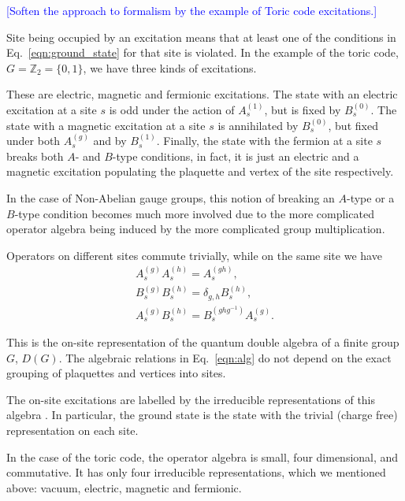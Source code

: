 \documentclass[two column]{article}
\newcommand{\jovan}[1]{\textcolor{blue}{[#1]}}
\begin{document}
\jovan{Soften the approach to formalism by the example of Toric code excitations.}

Site being occupied by an excitation means that at least one of the conditions in Eq.~\eqref{eqn:ground_state} for that site is violated. In the example of the toric code, $G = \mathbb{Z}_2 = \{0, 1\}$, we have three kinds of excitations. 

These are electric, magnetic and fermionic excitations. The state with an electric excitation at a site $s$ is odd under the action of $A_s^{(1)}$, but is fixed by $B_s^{(0)}$. The state with a magnetic excitation at a site $s$ is annihilated by $B_s^{(0)}$, but fixed under both $A_s^{(g)}$ and by $B_s^{(1)}$. Finally, the state with the fermion at a site $s$ breaks both $A$- and $B$-type conditions, in fact, it is just an electric and a magnetic excitation populating the plaquette and vertex of the site respectively.


In the case of Non-Abelian gauge groups, this notion of breaking an $A$-type or a $B$-type condition becomes much more involved due to the more complicated operator algebra being induced by the more complicated group multiplication.
 
Operators on different sites commute trivially, while on the same site we have 
\begin{equation}
    \begin{split}
        A_s^{(g)}A_s^{(h)} = A_s^{(gh)}, \\
        B_s^{(g)}B_s^{(h)} = \delta_{g,h} B_s^{(h)},\\
        A_s^{(g)}B_s^{(h)} = B_s^{(ghg^{-1})}A_s^{(g)}.
    \end{split}\label{eqn:alg}
\end{equation}

This is the on-site representation of the quantum double algebra of a finite group $G$, $D(G)$. The algebraic relations in Eq.~\eqref{eqn:alg} do not depend on the exact grouping of plaquettes and vertices into sites.

The on-site excitations are labelled by the irreducible representations of this algebra \cite{cui2018topological, Kitaev_2003}. In particular, the ground state is the state with the trivial (charge free) representation on each site.

In the case of the toric code, the operator algebra is small, four dimensional, and commutative. It has only four irreducible representations, which we mentioned above: vacuum, electric, magnetic and fermionic.
 
\end{document}
